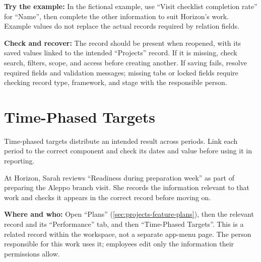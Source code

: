 \textbf{Try the example:} In the fictional example, use “Visit checklist completion rate” for “Name”, then complete the other information to suit Horizon's work. Example values do not replace the actual records required by relation fields.

\textbf{Check and recover:} The record should be present when reopened, with its saved values linked to the intended “Projects” record. If it is missing, check search, filters, scope, and access before creating another. If saving fails, resolve required fields and validation messages; missing tabs or locked fields require checking record type, framework, and stage with the responsible person.

\clearpage
\section{Time-Phased Targets}
\label{sec:projects-feature-planning-time-targets}

Time-phased targets distribute an intended result across periods. Link each period to the correct component and check its dates and value before using it in reporting.

\begin{rcnote}
At Horizon, Sarah reviews “Readiness during preparation week” as part of preparing the Aleppo branch visit. She records the information relevant to that work and checks it appears in the correct record before moving on.
\end{rcnote}

\textbf{Where and who:} Open “Plans” (\ref{sec:projects-feature-plans}), then the relevant record and its “Performance” tab, and then “Time-Phased Targets”. This is a related record within the workspace, not a separate app-menu page. The person responsible for this work uses it; employees edit only the information their permissions allow.

